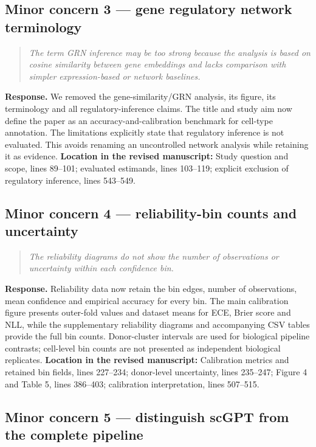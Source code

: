 \documentclass[10pt,a4paper]{article}
\newcommand{\commenttext}[1]{\begin{quote}\colorbox{gray!15}{\parbox{0.91\linewidth}{\itshape #1}}\end{quote}}
\begin{document}
\subsection*{Minor concern 3 --- gene regulatory network terminology}

\commenttext{The term GRN inference may be too strong because the analysis is based on cosine similarity between gene embeddings and lacks comparison with simpler expression-based or network baselines.}

\textcolor{responseblue}{\textbf{Response.}} We removed the gene-similarity/GRN analysis, its figure, its terminology and all regulatory-inference claims. The title and study aim now define the paper as an accuracy-and-calibration benchmark for cell-type annotation. The limitations explicitly state that regulatory inference is not evaluated. This avoids renaming an uncontrolled network analysis while retaining it as evidence. \textbf{Location in the revised manuscript:} Study question and scope, lines 89--101; evaluated estimands, lines 103--119; explicit exclusion of regulatory inference, lines 543--549.


\subsection*{Minor concern 4 --- reliability-bin counts and uncertainty}

\commenttext{The reliability diagrams do not show the number of observations or uncertainty within each confidence bin.}

\textcolor{responseblue}{\textbf{Response.}} Reliability data now retain the bin edges, number of observations, mean confidence and empirical accuracy for every bin. The main calibration figure presents outer-fold values and dataset means for ECE, Brier score and NLL, while the supplementary reliability diagrams and accompanying CSV tables provide the full bin counts. Donor-cluster intervals are used for biological pipeline contrasts; cell-level bin counts are not presented as independent biological replicates. \textbf{Location in the revised manuscript:} Calibration metrics and retained bin fields, lines 227--234; donor-level uncertainty, lines 235--247; Figure 4 and Table 5, lines 386--403; calibration interpretation, lines 507--515.


\subsection*{Minor concern 5 --- distinguish scGPT from the complete pipeline}
\end{document}
